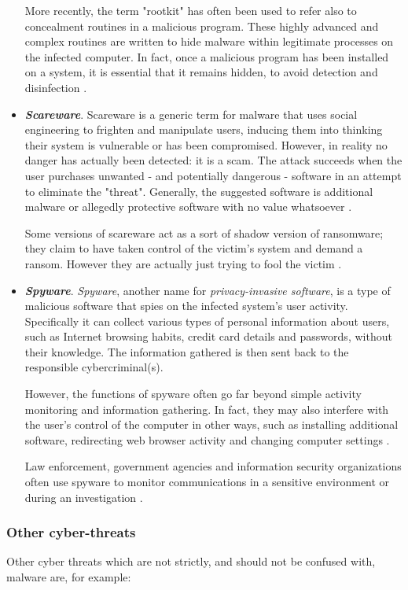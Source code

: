 \documentclass[pdfa%
,cucitura%
]{toptesi}
\begin{document}
\begin{itemize}
	More recently, the term "rootkit" has often been used to refer also to concealment routines in a malicious program. These highly advanced and complex routines are  written to hide malware within legitimate processes on the infected computer. In fact, once a malicious program has been installed on a system, it is essential that it remains hidden, to avoid detection and disinfection \cite{MullinsMT}.

	\item \textbf{\textit{Scareware}}. Scareware is a generic term for malware that uses social engineering to frighten and manipulate users, inducing them into thinking their system is vulnerable or has been compromised. However, in reality no danger has actually been detected: it is a scam. The attack succeeds when the user purchases unwanted - and potentially dangerous - software in an attempt to eliminate the "threat". Generally, the suggested software is additional malware or allegedly protective software with no value whatsoever \cite{MyraSecurityWIM}.

	Some versions of scareware act as a sort of shadow version of ransomware; they claim to have taken control of the victim's system and demand a ransom. However they are actually just trying to fool the victim \cite{FruhlingerME}.
	
	\item \textbf{\textit{Spyware}}. \textit{Spyware}, another name for \textit{privacy-invasive software}, is a type of malicious software that spies on the infected system's user activity. Specifically it can collect various types of personal information about users, such as Internet browsing habits, credit card details and passwords, without their knowledge. The information gathered is then sent back to the responsible cybercriminal(s).
		
	However, the functions of spyware often go far beyond simple activity monitoring and information gathering. In fact, they may also interfere with the user's control of the computer in other ways, such as installing additional software, redirecting web browser activity and changing computer settings \cite{MullinsMT}.
	
	Law enforcement, government agencies and information security organizations often use spyware to monitor communications in a sensitive environment or during an investigation \cite{McAfeeWIM}.
\end{itemize}

\subsubsection{Other cyber-threats}
Other cyber threats which are not strictly, and should not be confused with, malware are, for example:
\end{document}
